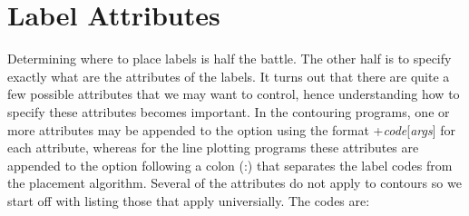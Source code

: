 \section{Label Attributes}
Determining where to place labels is half the battle.  The other half is to specify exactly
what are the attributes of the labels.  It turns out that there are quite a few possible
attributes that we may want to control, hence understanding how to specify these attributes
becomes important.  In the contouring programs, one or more attributes may be appended to the
 option using the format +{\it code}[{\it args}] for each attribute, whereas for the line
plotting programs these attributes are appended to the  option following a colon (:)
that separates the label codes from the placement algorithm.  Several of the attributes do not
apply to contours so we start off with listing those that apply universially.  The codes are:
